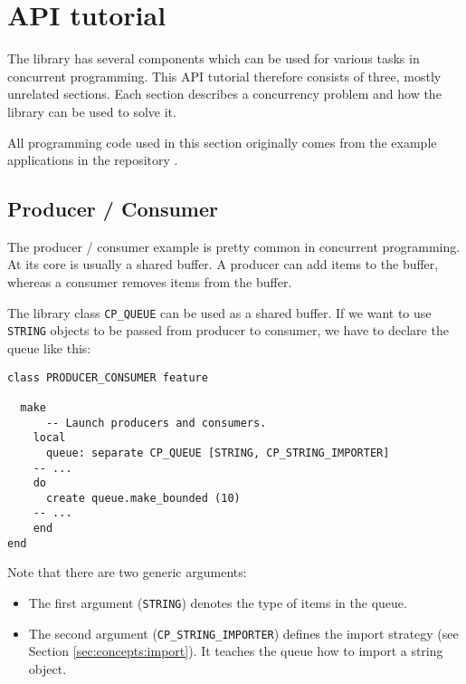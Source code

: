 
\section {API tutorial}
\label{sec:tutorial}

The library has several components which can be used for various tasks in concurrent programming.
This API tutorial therefore consists of three, mostly unrelated sections.
Each section describes a concurrency problem and how the library can be used to solve it.

All programming code used in this section originally comes from the example applications in the repository \cite{web:repository}.

\subsection{Producer / Consumer}

The producer / consumer example is pretty common in concurrent programming.
At its core is usually a shared buffer.
A producer can add items to the buffer, whereas a consumer removes items from the buffer.

The library class \lstinline!CP_QUEUE! can be used as a shared buffer.
If we want to use \lstinline!STRING! objects to be passed from producer to consumer, we have to declare the queue like this:

\begin{lstlisting}
class PRODUCER_CONSUMER feature

  make
      -- Launch producers and consumers.
    local
      queue: separate CP_QUEUE [STRING, CP_STRING_IMPORTER]
	-- ...
    do
      create queue.make_bounded (10)
	-- ...
    end
end
\end{lstlisting}

Note that there are two generic arguments:
\begin{itemize}
\item The first argument (\lstinline!STRING!) denotes the type of items in the queue.
\item The second argument (\lstinline!CP_STRING_IMPORTER!) defines the import strategy (see Section \ref{sec:concepts:import}).
  It teaches the queue how to import a string object.
\end{itemize}


